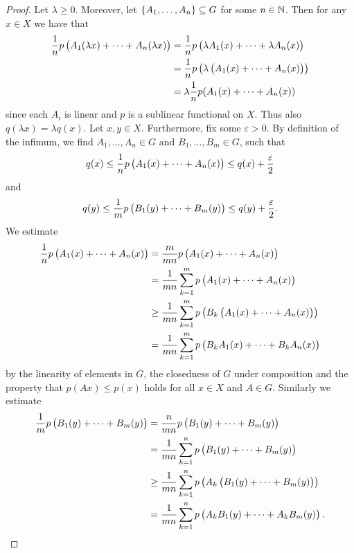 \begin{enumerate}[label = \textbf{Exercise \arabic*.},wide = 0pt, itemsep = 1.5ex]
		\begin{proof}
			Let $\lambda \geq 0$. Moreover, let $\cbr{A_1,\dots,A_n} \subseteq G$ for some $n \in \mathbb{N}$. Then for any $x \in X$ we have that
			\begin{align*}
				\frac{1}{n} p\del[1]{A_1(\lambda x) + \dots + A_n(\lambda x)} &= \frac{1}{n} p\del[1]{\lambda A_1(x) + \dots + \lambda A_n(x)}\\
				&= \frac{1}{n} p\del[1]{\lambda \del[1]{A_1(x) + \dots + A_n(x)}}\\
				&= \lambda\frac{1}{n} p(A_1(x) + \dots + A_n(x))
			\end{align*}
			\noindent since each $A_i$ is linear and $p$ is a sublinear functional on $X$. Thus also $q(\lambda x) = \lambda q(x)$. Let $x,y \in X$. Furthermore, fix some $\varepsilon > 0$. By definition of the infimum, we find $A_1,\dots,A_n \in G$ and $B_1,\dots,B_m \in G$, such that
			\begin{equation*}
				q(x) \leq \frac{1}{n}p\del[1]{A_1(x) + \dots + A_n(x)} \leq q(x) + \frac{\varepsilon}{2}
			\end{equation*}
			\noindent and
			\begin{equation*}
				q(y) \leq \frac{1}{m}p\del[1]{B_1(y) + \dots + B_m(y)} \leq q(y) + \frac{\varepsilon}{2}.
			\end{equation*}
			We estimate
			\begin{align*}
				\frac{1}{n}p\del[1]{A_1(x) + \dots + A_n(x)} &= \frac{m}{mn}p\del[1]{A_1(x) + \dots + A_n(x)}\\
				&= \frac{1}{mn} \sum_{k = 1}^m p\del[1]{A_1(x) + \dots + A_n(x)}\\
				&\geq \frac{1}{mn} \sum_{k = 1}^m p\del[1]{B_k\del[1]{A_1(x) + \dots + A_n(x)}}\\
				&= \frac{1}{mn} \sum_{k = 1}^m p\del[1]{B_kA_1(x) + \dots + B_kA_n(x)}
			\end{align*}
			\noindent by the linearity of elements in $G$, the closedness of $G$ under composition and the property that $p(Ax) \leq p(x)$ holds for all $x \in X$ and $A \in G$. Similarly we estimate
			\begin{align*}
				\frac{1}{m}p\del[1]{B_1(y) + \dots + B_m(y)} &= \frac{n}{mn}p\del[1]{B_1(y) + \dots + B_m(y)}\\
				&= \frac{1}{mn} \sum_{k = 1}^n p\del[1]{B_1(y) + \dots + B_m(y)}\\
				&\geq \frac{1}{mn} \sum_{k = 1}^n p\del[1]{A_k\del[1]{B_1(y) + \dots + B_m(y)}}\\
				&= \frac{1}{mn} \sum_{k = 1}^n p\del[1]{A_kB_1(y) + \dots + A_kB_m(y)}.

\end{align*}
\end{proof}
\end{enumerate}
